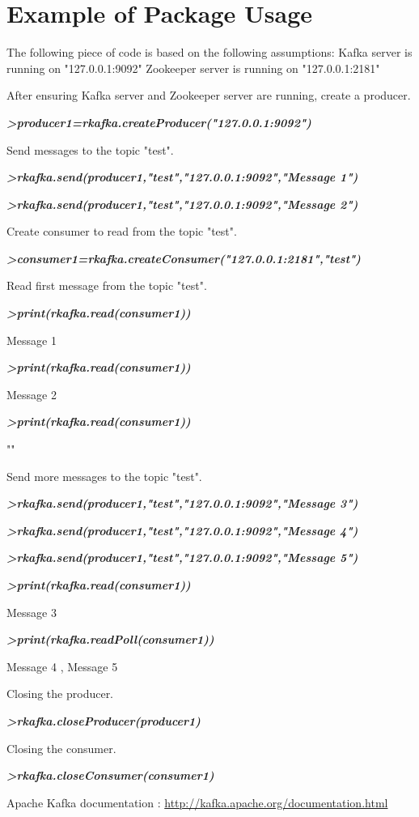 \documentclass[english,pdftex,a4paper]{article}
\begin{document}
\section{Example of Package Usage}
\par{The following piece of code is based on the following assumptions:
Kafka server is running on "127.0.0.1:9092"
Zookeeper server is running on "127.0.0.1:2181"}
\par{After ensuring Kafka server and Zookeeper server are running, create a producer.}
\par{\textit{\textbf{>producer1=rkafka.createProducer("127.0.0.1:9092")}}}
\par{Send messages to the topic "test".}
\par{\textit{\textbf{>rkafka.send(producer1,"test","127.0.0.1:9092","Message 1")}}}
\par{\textit{\textbf{>rkafka.send(producer1,"test","127.0.0.1:9092","Message 2")}}}
\par{Create consumer to read from the topic "test".}
\par{\textit{\textbf{>consumer1=rkafka.createConsumer("127.0.0.1:2181","test")}}}
\par{Read first message from the topic "test".}
\par{\textit{\textbf{>print(rkafka.read(consumer1))}}}
\par{Message 1}
\par{\textit{\textbf{>print(rkafka.read(consumer1))}}}
\par{Message 2}
\par{\textit{\textbf{>print(rkafka.read(consumer1))}}}
\par{""}
\par{Send more messages to the topic "test".}
\par{\textit{\textbf{>rkafka.send(producer1,"test","127.0.0.1:9092","Message 3")}}}
\par{\textit{\textbf{>rkafka.send(producer1,"test","127.0.0.1:9092","Message 4")}}}
\par{\textit{\textbf{>rkafka.send(producer1,"test","127.0.0.1:9092","Message 5")}}}
\par{
\textit{\textbf{>print(rkafka.read(consumer1))}}}
\par{Message 3}
\par{\textit{\textbf{>print(rkafka.readPoll(consumer1))}}}
\par{Message 4 , Message 5}
\par{Closing the producer.}
\par{\textit{\textbf{>rkafka.closeProducer(producer1)}}}
\par{Closing the consumer.}
\par{\textit{\textbf{>rkafka.closeConsumer(consumer1)}}}

\newpage
\begin{thebibliography}{}
\bibitem{}Apache Kafka documentation : \url{http://kafka.apache.org/documentation.html}
\end{thebibliography}
\end{document}
